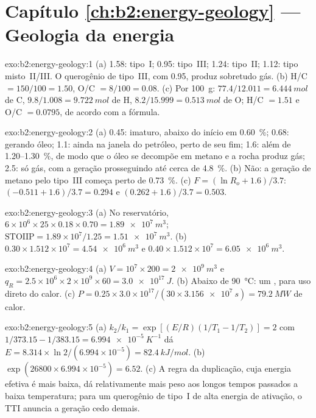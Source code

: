 \section*{Capítulo \ref{ch:b2:energy-geology} --- Geologia da energia}

\begin{solution}{exo:b2:energy-geology:1}
(a) 1.58: tipo~I; 0.95: tipo~III; 1.24: tipo~II; 1.12: tipo misto~II/III. O querogênio de tipo~III, com
0.95, produz sobretudo gás. (b) H/C $= 150/100 = 1.50$, O/C $= 8/100 = 0.08$. (c) Por \qty{100}{g}:
$77.4/12.011 = \qty{6.444}{mol}$ de C, $9.8/1.008 = \qty{9.722}{mol}$ de H, $8.2/15.999 =
\qty{0.513}{mol}$ de O; H/C $= 1.51$ e O/C $= 0.0795$, de acordo com a fórmula.
\end{solution}

\begin{solution}{exo:b2:energy-geology:2}
(a) 0.45: imaturo, abaixo do início em \qty{0.60}{\percent}; 0.68: gerando óleo; 1.1: ainda na
janela do petróleo, perto de seu fim; 1.6: além de 1.20--\qty{1.30}{\percent}, de modo que o óleo se decompõe em metano e a
rocha produz gás; 2.5: só gás, com a geração prosseguindo até cerca de \qty{4.8}{\percent}. (b) Não: a geração
de metano pelo tipo~III começa perto de \qty{0.73}{\percent}. (c) $F = (\ln R_o + 1.6)/3.7$: $(-0.511 +
1.6)/3.7 = 0.294$ e $(0.262 + 1.6)/3.7 = 0.503$.
\end{solution}

\begin{solution}{exo:b2:energy-geology:3}
(a) No reservatório, $6 \times 10^6 \times 25 \times 0.18 \times 0.70 = \qty{1.89e7}{m^3}$;
$\mathrm{STOIIP} = 1.89 \times 10^7/1.25 = \qty{1.51e7}{m^3}$. (b) $0.30 \times 1.512 \times 10^7 =
\qty{4.54e6}{m^3}$ e $0.40 \times 1.512 \times 10^7 = \qty{6.05e6}{m^3}$.
\end{solution}

\begin{solution}{exo:b2:energy-geology:4}
(a) $V = 10^7 \times 200 = \qty{2e9}{m^3}$ e $q_R = 2.5 \times 10^6 \times 2 \times 10^9 \times 60
= \qty{3.0e17}{J}$. (b) Abaixo de \qty{90}{\celsius}: um , para uso direto do
calor. (c) $P = 0.25 \times 3.0 \times 10^{17}/(30 \times \qty{3.156e7}{s}) = \qty{79.2}{MW}$ de calor.
\end{solution}

\begin{solution}{exo:b2:energy-geology:5}
(a) $k_2/k_1 = \exp[(E/R)(1/T_1 - 1/T_2)] = 2$ com $1/373.15 - 1/383.15 = \qty{6.994e-5}{K^{-1}}$
dá $E = 8.314 \times \ln 2/(6.994 \times 10^{-5}) = \qty{82.4}{kJ/mol}$. (b) $\exp(26800 \times
6.994 \times 10^{-5}) = 6.52$. (c) A regra da duplicação, cuja energia efetiva é mais baixa, dá
relativamente mais peso aos longos tempos passados a baixa temperatura; para um querogênio de tipo~I de alta
energia de ativação, o TTI anuncia a geração cedo demais.
\end{solution}

